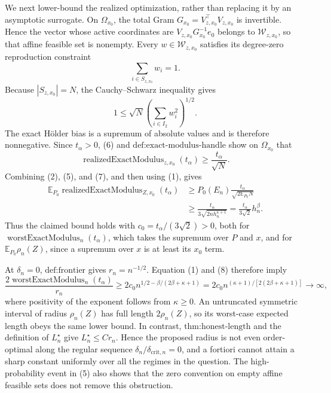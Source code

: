 We next lower-bound the realized optimization, rather than replacing it by an asymptotic surrogate.  On \(\Omega_{x_0}\), the total Gram \(G_{x_0}=V_{z,x_0}^\top V_{z,x_0}\) is invertible.  Hence the vector whose active coordinates are
\(V_{z,x_0}G_{x_0}^{-1}e_0\) belongs to \(\mathcal W_{z,x_0}\), so that affine feasible set is nonempty.  Every \(w\in\mathcal W_{z,x_0}\) satisfies its degree-zero reproduction constraint
\[
\sum_{i\in S_{z,x_0}}w_i=1.
\]
Because \(|S_{z,x_0}|=N\), the Cauchy--Schwarz inequality gives
\[
1\leq \sqrt N\left(\sum_{i\in I_2}w_i^2\right)^{1/2}.
\tag{6}
\]
The exact Hölder bias is a supremum of absolute values and is therefore nonnegative.  Since \(t_\alpha>0\), (6) and \(\text{def:exact-modulus-handle}\) show on \(\Omega_{x_0}\) that
\[
\operatorname{realizedExactModulus}_{z,x_0}(t_\alpha)
\geq \frac{t_\alpha}{\sqrt N}.
\tag{7}
\]
Combining (2), (5), and (7), and then using (1), gives
\[
\begin{aligned}
\mathbb E_{P_0}\operatorname{realizedExactModulus}_{Z,x_0}(t_\alpha)
&\geq P_0(E_n)\frac{t_\alpha}{\sqrt{2\mathbb E_{P_0}N}}\\
&\geq \frac{t_\alpha}{3\sqrt{2nh_n^{\kappa+1}}}
=\frac{t_\alpha}{3\sqrt2}h_n^\beta.
\end{aligned}
\tag{8}
\]
Thus the claimed bound holds with \(c_0=t_\alpha/(3\sqrt2)>0\), both for \(\operatorname{worstExactModulus}_n(t_\alpha)\), which takes the supremum over \(P\) and \(x\), and for \(\mathbb E_{P_0}\rho_n(Z)\), since a supremum over \(x\) is at least its \(x_0\) term.

At \(\delta_n=0\), \(\text{def:frontier}\) gives \(r_n=n^{-1/2}\).  Equation (1) and (8) therefore imply
\[
\frac{2\operatorname{worstExactModulus}_n(t_\alpha)}{r_n}
\geq 2c_0 n^{1/2-\beta/(2\beta+\kappa+1)}
=2c_0n^{(\kappa+1)/[2(2\beta+\kappa+1)]}\longrightarrow\infty,
\tag{9}
\]
where positivity of the exponent follows from \(\kappa\geq0\).  An untruncated symmetric interval of radius \(\rho_n(Z)\) has full length \(2\rho_n(Z)\), so its worst-case expected length obeys the same lower bound.  In contrast, \(\text{thm:honest-length}\) and the definition of \(L_n^\star\) give \(L_n^\star\leq Cr_n\).  Hence the proposed radius is not even order-optimal along the regular sequence \(\delta_n/\delta_{\mathrm{crit},n}=0\), and a fortiori cannot attain a sharp constant uniformly over all the regimes in the question.  The high-probability event in (5) also shows that the zero convention on empty affine feasible sets does not remove this obstruction.